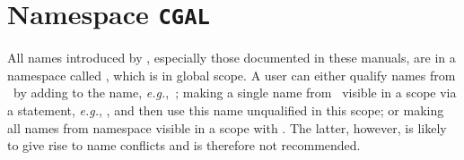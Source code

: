 \section{Namespace \texttt{CGAL}}
All names introduced by \cgal, especially those documented in these manuals,
are in a namespace called , which is in global 
scope.
A user can either qualify names from \cgal\ by adding  to the name,
\textit{e.g.},\ ; making a 
single name from \cgal\ visible in a scope via a  statement, 
\textit{e.g.}, , and then use this name 
unqualified in this scope; or making all names from namespace  
visible in a scope with . The latter, however, is 
likely to give rise to name conflicts and is therefore not recommended.   
